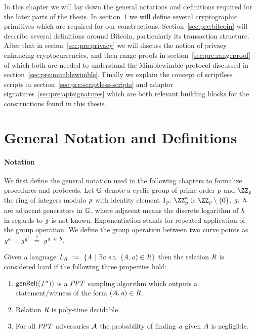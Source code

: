 In this chapter we will lay down the general notations and definitions required for the later parts of the thesis.
In section~\ref{sec:pre:general} we will define several cryptographic primitives which are required for our constructions.
Section~\ref{sec:pre:bitcoin} will describe several definitions around Bitcoin, particularly its transaction structure.
After that in secion~\ref{sec:pre:privacy} we will discuss the notion of privacy enhancing cryptocurrencies, and then range proofs in section~\ref{sec:pre:rangeproof} of which both are needed to understand the Mimblewimble protocol discussed in section~\ref{sec:pre:mimblewimble}.
Finally we explain the concept of scriptless scripts in section~\ref{sec:pre:scriptless-scripts} and adaptor signatures~\ref{sec:pre:aptsignatures} which are both relevant building blocks for the constructions found in this thesis.

\section{General Notation and Definitions}\label{sec:pre:general}

\paragraph{Notation}
We first define the general notation used in the following chapters to formalize procedures and protocols.
Let $\mathbb{G}$ denote a cyclic group of prime order $\mathit{p}$ and $\cnstIntegersPrime{\varPrime}$ the ring of integers modulo $\mathit{p}$ with identity element $1_{\mathit{p}}$.
$\cnstIntegersPrimeWithoutZero{\varPrime}$ is $\cnstIntegersPrime{\varPrime} \opExcluding \funList{0}$.
$\mathit{g} ,~ \mathit{h}$ are adjacent generators in $\mathbb{G}$, where adjacent means the discrete logarithm of $\mathit{h}$ in regards to $\mathit{g}$ is not known.
Exponentiation stands for repeated application of the group operation.
We define the group operation between two curve points as $\mathit{g}^{\mathit{a}} ~\cdot~ \mathit{g}^{\mathit{g}^{\mathit{b}}} ~\stackrel{?}{=}~ \mathit{g}^{\mathit{a} ~+~ \mathit{b}}$.

\begin{definition}\label{def:pre:hard-relation}
    Given a language $\mathit{L}_{\mathit{R}} ~:=~ \{\mathit{A} ~|~ \exists\mathit{a} \text{ s.t. } (\mathit{A}, \mathit{a}) \in \mathit{R}\}$ then the relation $\mathit{R}$ is
    considered hard if the following three properties hold:~\cite{aumayr2020bitcoinchannels}
    \begin{enumerate}
        \item $\mathsf{genRel}((\mathit{1^n}))$ is a $\mathit{PPT}$ sampling algorithm which outputs a statement/witness of the form $(\mathit{A}, \mathit{a}) \in \mathit{R}$.
        \item Relation $\mathit{R}$ is poly-time decidable.
        \item For all $\mathit{PPT}$ adversaries $\mathcal{A}$ the probability of finding $\mathit{a}$ given $\mathit{A}$ is negligible.
    \end{enumerate}
\end{definition}

